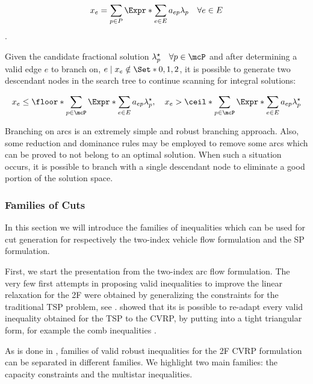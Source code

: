 \begin{equation}
    x_e = \sum_{p \in P} \Expr*{\sum_{e \in E} a_{ep}} \lambda_p  \quad \forall e \in E
\end{equation}.

Given the candidate fractional solution $\lambda^\star_p \quad \forall p \in \mcP$
and after determining a valid edge $e$ to branch on, $e \mid x_e \notin \Set*{0, 1, 2}$,
it is possible to generate two descendant nodes in the search tree
to continue scanning for integral solutions:

\begin{equation}
    x_e \le \floor*{\sum_{p \in \mcP} \Expr*{\sum_{e \in E} a_{ep}} \lambda^\star_p}, \quad
    x_e > \ceil*{\sum_{p \in \mcP} \Expr*{\sum_{e \in E} a_{ep}} \lambda^\star_p}
\end{equation}


Branching on arcs is an extremely simple and robust branching approach.
Also, some reduction and dominance rules may be employed to remove some arcs
which can be proved to not belong to an optimal solution.
When such a situation occurs, it is possible to branch with a single descendant node to eliminate
a good portion of the solution space.


\subsubsection{Families of Cuts}
\label{sec:families-of-cuts}

In this section we will introduce the families of inequalities
which can be used for cut generation for respectively
the two-index vehicle flow formulation
and the SP formulation.


First, we start the presentation from the two-index arc flow formulation.
The very few first attempts in proposing valid inequalities
to improve the linear relaxation for the 2F were obtained by
generalizing the constraints for the traditional TSP problem, see \textcite{naddef1993}.
\citeauthor{naddef1993} showed that its is possible to re-adapt
every valid inequality obtained for the TSP to the CVRP,
by putting into a tight triangular form,
for example the comb inequalities \parencite{chvatal1973,grotschel1979,augerat1995a}.

As is done in \textcite{toth2014},
families of valid robust inequalities for the 2F CVRP formulation
can be separated in different families.
We highlight two main families: the capacity constraints and the multistar inequalities.

